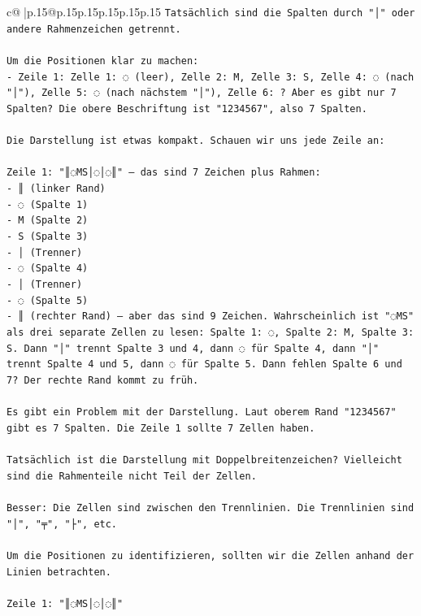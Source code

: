 \documentclass{article}
\begin{document}
{\begin{supertabular}{c@{$\;$}|p{.15\linewidth}@{}p{.15\linewidth}p{.15\linewidth}p{.15\linewidth}p{.15\linewidth}p{.15\linewidth}}
{{{\texttt{Tatsächlich sind die Spalten durch "│" oder andere Rahmenzeichen getrennt.} \\
\\ 
\texttt{Um die Positionen klar zu machen:} \\
\texttt{{-} Zeile 1: Zelle 1: ◌ (leer), Zelle 2: M, Zelle 3: S, Zelle 4: ◌ (nach "│"), Zelle 5: ◌ (nach nächstem "│"), Zelle 6: ? Aber es gibt nur 7 Spalten? Die obere Beschriftung ist "1234567", also 7 Spalten.} \\
\\ 
\texttt{Die Darstellung ist etwas kompakt. Schauen wir uns jede Zeile an:} \\
\\ 
\texttt{Zeile 1: "║◌MS│◌│◌║" – das sind 7 Zeichen plus Rahmen:} \\
\texttt{{-} ║ (linker Rand)} \\
\texttt{{-} ◌ (Spalte 1)} \\
\texttt{{-} M (Spalte 2)} \\
\texttt{{-} S (Spalte 3)} \\
\texttt{{-} │ (Trenner)} \\
\texttt{{-} ◌ (Spalte 4)} \\
\texttt{{-} │ (Trenner)} \\
\texttt{{-} ◌ (Spalte 5)} \\
\texttt{{-} ║ (rechter Rand) – aber das sind 9 Zeichen. Wahrscheinlich ist "◌MS" als drei separate Zellen zu lesen: Spalte 1: ◌, Spalte 2: M, Spalte 3: S. Dann "│" trennt Spalte 3 und 4, dann ◌ für Spalte 4, dann "│" trennt Spalte 4 und 5, dann ◌ für Spalte 5. Dann fehlen Spalte 6 und 7? Der rechte Rand kommt zu früh.} \\
\\ 
\texttt{Es gibt ein Problem mit der Darstellung. Laut oberem Rand "1234567" gibt es 7 Spalten. Die Zeile 1 sollte 7 Zellen haben.} \\
\\ 
\texttt{Tatsächlich ist die Darstellung mit Doppelbreitenzeichen? Vielleicht sind die Rahmenteile nicht Teil der Zellen.} \\
\\ 
\texttt{Besser: Die Zellen sind zwischen den Trennlinien. Die Trennlinien sind "│", "╤", "├", etc.} \\
\\ 
\texttt{Um die Positionen zu identifizieren, sollten wir die Zellen anhand der Linien betrachten.} \\
\\ 
\texttt{Zeile 1: "║◌MS│◌│◌║"} \\
}}}
\end{supertabular}}
\end{document}
